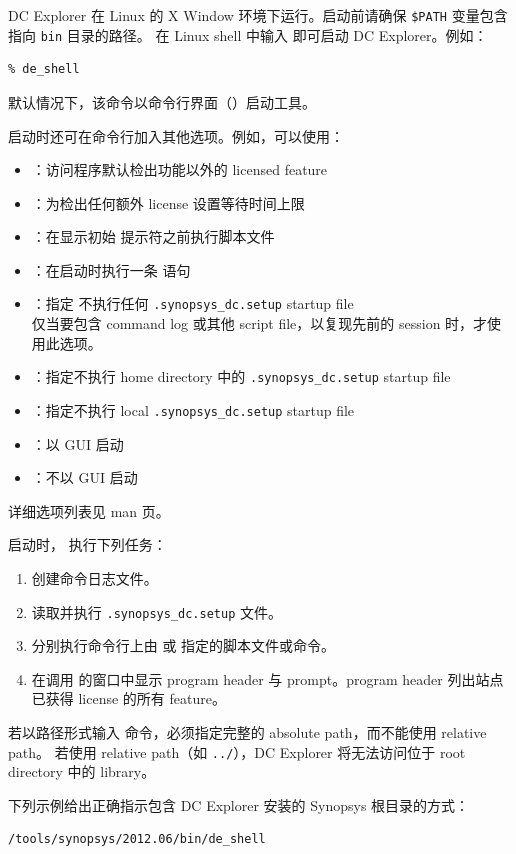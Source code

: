 DC Explorer 在 Linux 的 X Window 环境下运行。启动前请确保 \texttt{\$PATH} 变量包含指向 \texttt{bin} 目录的路径。
在 Linux shell 中输入  即可启动 DC Explorer。例如：
\begin{lstlisting}
% de_shell
\end{lstlisting}
默认情况下，该命令以命令行界面（）启动工具。

启动时还可在命令行加入其他选项。例如，可以使用：
\begin{itemize}
  \item {}：访问程序默认检出功能以外的 licensed feature
  \item {}：为检出任何额外 license 设置等待时间上限
  \item {}：在显示初始  提示符之前执行脚本文件
  \item {}：在启动时执行一条  语句
  \item {}：指定  不执行任何 \texttt{.synopsys\_dc.setup} startup file\\
        仅当要包含 command log 或其他 script file，以复现先前的  session 时，才使用此选项。
  \item {}：指定不执行 home directory 中的 \texttt{.synopsys\_dc.setup} startup file
  \item {}：指定不执行 local \texttt{.synopsys\_dc.setup} startup file
  \item {}：以 GUI 启动 
  \item {}：不以 GUI 启动 
\end{itemize}

详细选项列表见  man 页。

启动时， 执行下列任务：
\begin{enumerate}
  \item 创建命令日志文件。
  \item 读取并执行 \texttt{.synopsys\_dc.setup} 文件。
  \item 分别执行命令行上由  或  指定的脚本文件或命令。
  \item 在调用  的窗口中显示 program header 与  prompt。program header 列出站点已获得 license 的所有 feature。
\end{enumerate}

\begin{noteBox}
若以路径形式输入  命令，必须指定完整的 absolute path，而不能使用 relative path。
若使用 relative path（如 \texttt{../}），DC Explorer 将无法访问位于 root directory 中的 library。

下列示例给出正确指示包含 DC Explorer 安装的 Synopsys 根目录的方式：
\begin{lstlisting}
/tools/synopsys/2012.06/bin/de_shell
\end{lstlisting}
\end{noteBox}

